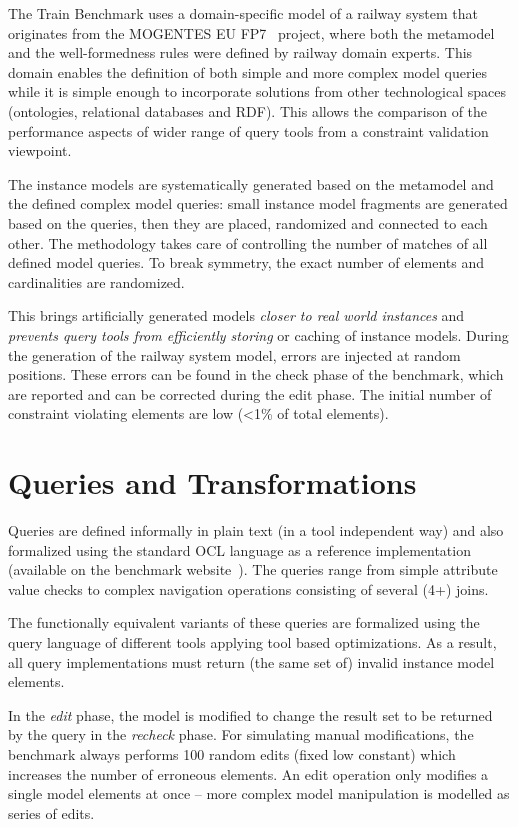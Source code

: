 The Train Benchmark uses a domain-specific model of a railway system that originates from the \mbox{MOGENTES} EU FP7~\cite{Mogentes} project, where both the metamodel and the well-formedness rules were defined by railway domain experts. This domain enables the definition of both simple and more complex model queries while it is  simple enough to incorporate solutions from other technological spaces (\eg ontologies, relational databases and RDF). This allows the comparison of  the performance aspects of wider range of query tools from a constraint validation viewpoint.

The instance models are systematically generated based on the metamodel and the defined complex model queries: small instance model fragments are generated based on the queries, then they are placed, randomized and connected to each other. The methodology takes care of controlling the number of matches of all defined model queries. To break symmetry, the exact number of elements and cardinalities are randomized.
 
This brings artificially generated models \emph{closer to real world instances} and \emph{prevents query tools from efficiently storing} or caching of instance models. During the generation of the railway system model, errors are injected at random positions. These errors can be found in the check phase of the benchmark, which are reported and can be corrected during the edit phase. The initial number of constraint violating elements are low (<1\% of total elements).
 
\section{Queries and Transformations}

Queries are defined informally in plain text (in a tool independent way) and also formalized using the standard OCL language as a reference implementation (available on the benchmark website~\cite{TBwebsite}). The queries range from simple attribute value checks to complex navigation operations consisting of several (4+) joins.

The functionally equivalent variants of these queries are formalized using the query language of different tools applying tool based optimizations. As a result, all query implementations must return (the same set of) invalid instance model elements.
 
In the \emph{edit} phase, the model is modified to change the result set to be returned by the query in the \emph{recheck} phase. For simulating manual modifications, the benchmark always performs 100 random edits (fixed low constant) which increases the number of erroneous elements. An edit operation only modifies a single model elements at once -- more complex model manipulation is modelled as series of edits.

